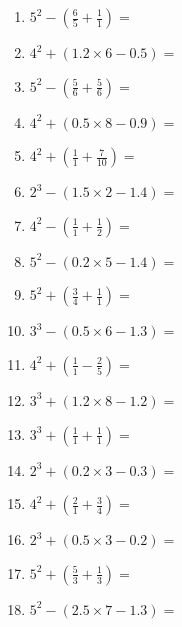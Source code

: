 \documentclass[12pt]{article}
\begin{document}
\begin{enumerate}
\item \large $ 5^{2} - (\frac{6}{5} + \frac{1}{1}) = $ \vspace{1.6cm}
\item \large $ 4^{2} + (1.2 \times 6 - 0.5) = $ \vspace{1.6cm}
\item \large $ 5^{2} - (\frac{5}{6} + \frac{5}{6}) = $ \vspace{1.6cm}
\item \large $ 4^{2} + (0.5 \times 8 - 0.9) = $ \vspace{1.6cm}
\newpage
\item \large $ 4^{2} + (\frac{1}{1} + \frac{7}{10}) = $ \vspace{1.6cm}
\item \large $ 2^{3} - (1.5 \times 2 - 1.4) = $ \vspace{1.6cm}
\item \large $ 4^{2} - (\frac{1}{1} + \frac{1}{2}) = $ \vspace{1.6cm}
\item \large $ 5^{2} - (0.2 \times 5 - 1.4) = $ \vspace{1.6cm}
\item \large $ 5^{2} + (\frac{3}{4} + \frac{1}{1}) = $ \vspace{1.6cm}
\item \large $ 3^{3} - (0.5 \times 6 - 1.3) = $ \vspace{1.6cm}
\item \large $ 4^{2} + (\frac{1}{1} - \frac{2}{5}) = $ \vspace{1.6cm}
\item \large $ 3^{3} + (1.2 \times 8 - 1.2) = $ \vspace{1.6cm}
\item \large $ 3^{3} + (\frac{1}{1} + \frac{1}{1}) = $ \vspace{1.6cm}
\item \large $ 2^{3} + (0.2 \times 3 - 0.3) = $ \vspace{1.6cm}
\newpage
\item \large $ 4^{2} + (\frac{2}{1} + \frac{3}{4}) = $ \vspace{1.6cm}
\item \large $ 2^{3} + (0.5 \times 3 - 0.2) = $ \vspace{1.6cm}
\item \large $ 5^{2} + (\frac{5}{3} + \frac{1}{3}) = $ \vspace{1.6cm}
\item \large $ 5^{2} - (2.5 \times 7 - 1.3) = $ \vspace{1.6cm}

\end{enumerate}
\end{document}
